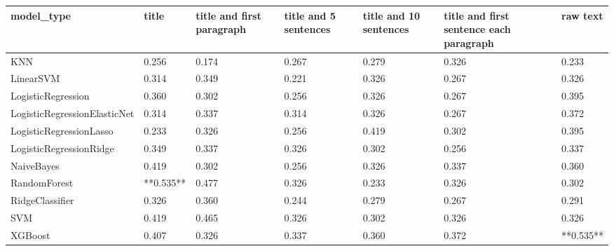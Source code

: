 \begin{tabular}{lllllll}
\toprule
                  model\_type &     title & title and first paragraph & title and 5 sentences & title and 10 sentences & title and first sentence each paragraph &  raw text \\
\midrule
                         KNN &     0.256 &                     0.174 &                 0.267 &                  0.279 &                                   0.326 &     0.233 \\
                   LinearSVM &     0.314 &                     0.349 &                 0.221 &                  0.326 &                                   0.267 &     0.326 \\
          LogisticRegression &     0.360 &                     0.302 &                 0.256 &                  0.326 &                                   0.267 &     0.395 \\
LogisticRegressionElasticNet &     0.314 &                     0.337 &                 0.314 &                  0.326 &                                   0.267 &     0.372 \\
     LogisticRegressionLasso &     0.233 &                     0.326 &                 0.256 &                  0.419 &                                   0.302 &     0.395 \\
     LogisticRegressionRidge &     0.349 &                     0.337 &                 0.326 &                  0.302 &                                   0.256 &     0.337 \\
                  NaiveBayes &     0.419 &                     0.302 &                 0.256 &                  0.326 &                                   0.337 &     0.360 \\
                RandomForest & **0.535** &                     0.477 &                 0.326 &                  0.233 &                                   0.326 &     0.302 \\
             RidgeClassifier &     0.326 &                     0.360 &                 0.244 &                  0.279 &                                   0.267 &     0.291 \\
                         SVM &     0.419 &                     0.465 &                 0.326 &                  0.302 &                                   0.326 &     0.326 \\
                     XGBoost &     0.407 &                     0.326 &                 0.337 &                  0.360 &                                   0.372 & **0.535** \\
\bottomrule
\end{tabular}
